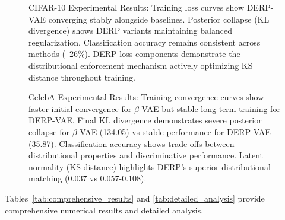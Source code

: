 \documentclass[11pt]{article}
\begin{document}
\begin{figure}[ht]
\centering
\caption{CIFAR-10 Experimental Results: Training loss curves show DERP-VAE converging stably alongside baselines. Posterior collapse (KL divergence) shows DERP variants maintaining balanced regularization. Classification accuracy remains consistent across methods (~26\%). DERP loss components demonstrate the distributional enforcement mechanism actively optimizing KS distance throughout training.}
\label{fig:cifar_results}
\end{figure}

\begin{figure}[ht]
\centering
\caption{CelebA Experimental Results: Training convergence curves show faster initial convergence for $\beta$-VAE but stable long-term training for DERP-VAE. Final KL divergence demonstrates severe posterior collapse for $\beta$-VAE (134.05) vs stable performance for DERP-VAE (35.87). Classification accuracy shows trade-offs between distributional properties and discriminative performance. Latent normality (KS distance) highlights DERP's superior distributional matching (0.037 vs 0.057-0.108).}
\label{fig:celeba_results}
\end{figure}

Tables~\ref{tab:comprehensive_results} and \ref{tab:detailed_analysis} provide comprehensive numerical results and detailed analysis.
\end{document}
